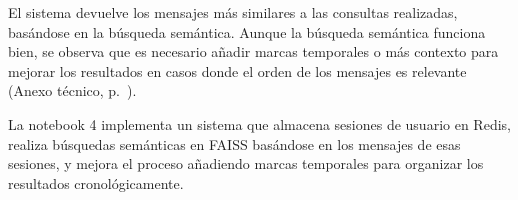 El sistema devuelve los mensajes más similares a las consultas realizadas, basándose en la búsqueda semántica. Aunque la búsqueda semántica funciona bien, se observa que es necesario añadir marcas temporales o más contexto para mejorar los resultados en casos donde el orden de los mensajes es relevante (Anexo técnico, p.~\pageref{anexo:code-4-1-4-8}).

La notebook 4 implementa un sistema que almacena sesiones de usuario en Redis, realiza búsquedas semánticas en FAISS basándose en los mensajes de esas sesiones, y mejora el proceso añadiendo marcas temporales para organizar los resultados cronológicamente. 